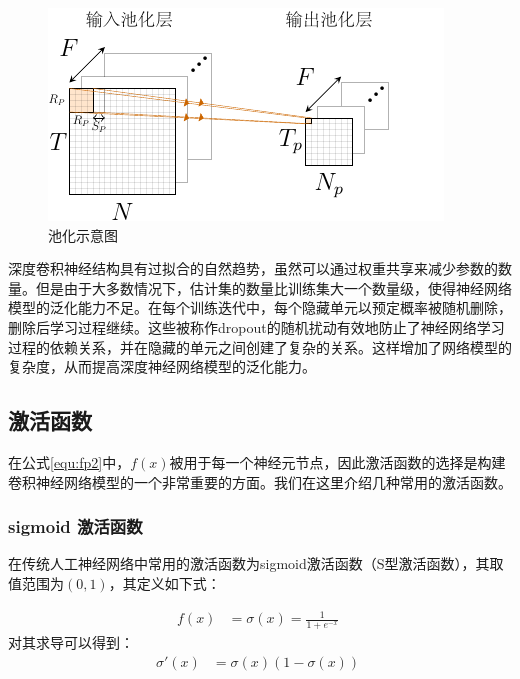 \begin{figure}[!t]
	\centering
	\includegraphics[width=\textwidth]{figures/networks/pool}
	\caption{池化示意图}
	\label{fig:pool}
\end{figure}

深度卷积神经结构具有过拟合的自然趋势，虽然可以通过权重共享来减少参数的数量。但是由于大多数情况下，估计集的数量比训练集大一个数量级，使得神经网络模型的泛化能力不足。在每个训练迭代中，每个隐藏单元以预定概率被随机删除，删除后学习过程继续。这些被称作dropout的随机扰动有效地防止了神经网络学习过程的依赖关系，并在隐藏的单元之间创建了复杂的关系。这样增加了网络模型的复杂度，从而提高深度神经网络模型的泛化能力。


\subsection{激活函数}

在公式\ref{equ:fp2}中，$f(x)$被用于每一个神经元节点，因此激活函数的选择是构建卷积神经网络模型的一个非常重要的方面。我们在这里介绍几种常用的激活函数。


\subsubsection{sigmoid 激活函数}

在传统人工神经网络中常用的激活函数为sigmoid激活函数（S型激活函数），其取值范围为$(0,1)$，其定义如下式：

\begin{align}
f(x)&=\sigma(x)=\frac{1}{1+e^{-x}}\;
\end{align}
对其求导可以得到：
\begin{align}
\sigma'(x)&=\sigma(x)\left(1-\sigma(x)\right)\;
\end{align}

